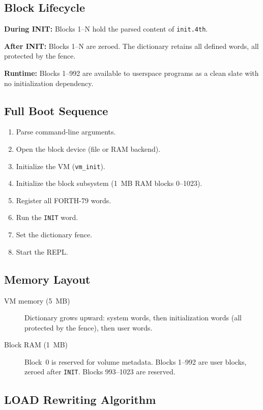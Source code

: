 \subsection{Block Lifecycle}

\textbf{During INIT:} Blocks 1--N hold the parsed content of
\texttt{init.4th}.

\textbf{After INIT:} Blocks 1--N are zeroed. The dictionary retains all
defined words, all protected by the fence.

\textbf{Runtime:} Blocks 1--992 are available to userspace programs as a
clean slate with no initialization dependency.

\subsection{Full Boot Sequence}

\begin{enumerate}
  \item Parse command-line arguments.
  \item Open the block device (file or RAM backend).
  \item Initialize the VM (\texttt{vm\_init}).
  \item Initialize the block subsystem (1~MB RAM blocks 0--1023).
  \item Register all FORTH-79 words.
  \item Run the \texttt{INIT} word.
  \item Set the dictionary fence.
  \item Start the REPL.
\end{enumerate}

\subsection{Memory Layout}

\begin{description}
  \item[VM memory (5~MB)] Dictionary grows upward: system words, then
        initialization words (all protected by the fence), then user words.
  \item[Block RAM (1~MB)] Block~0 is reserved for volume metadata. Blocks
        1--992 are user blocks, zeroed after \texttt{INIT}. Blocks 993--1023
        are reserved.
\end{description}

\subsection{LOAD Rewriting Algorithm}

